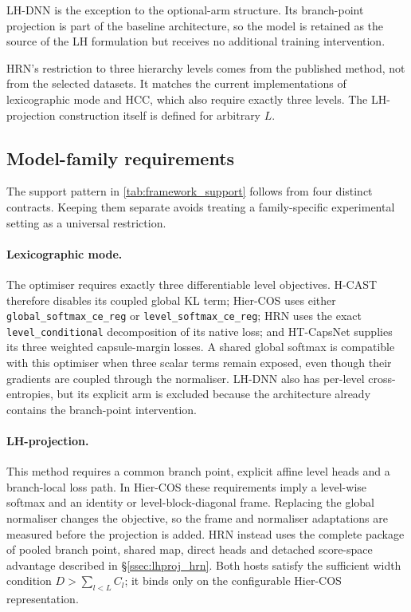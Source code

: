 LH-DNN is the exception to the optional-arm structure. Its branch-point
projection is part of the baseline architecture, so the model is retained as
the source of the LH formulation but receives no additional training
intervention.

HRN's restriction to three hierarchy levels comes from the published method,
not from the selected datasets. It matches the current implementations of
lexicographic mode and HCC, which also require exactly three levels. The
LH-projection construction itself is defined for arbitrary $L$.

\subsection{Model-family requirements}
\label{ssec:design_space}

The support pattern in \cref{tab:framework_support} follows from four distinct
contracts. Keeping them separate avoids treating a family-specific experimental
setting as a universal restriction.

\paragraph{Lexicographic mode.}
The optimiser requires exactly three differentiable level objectives. H-CAST
therefore disables its coupled global KL term; Hier-COS uses either
\texttt{global\_softmax\_ce\_reg} or \texttt{level\_softmax\_ce\_reg}; HRN uses
the exact \texttt{level\_conditional} decomposition of its native loss; and
HT-CapsNet supplies its three weighted capsule-margin losses. A shared global
softmax is compatible with this optimiser when three scalar terms remain
exposed, even though their gradients are coupled through the normaliser.
LH-DNN also has per-level cross-entropies, but its explicit arm is excluded
because the architecture already contains the branch-point intervention.

\paragraph{LH-projection.}
This method requires a common branch point, explicit affine level heads and a
branch-local loss path. In Hier-COS these requirements imply a level-wise
softmax and an identity or level-block-diagonal frame. Replacing the global
normaliser changes the objective, so the frame and normaliser adaptations are
measured before the projection is added. HRN instead uses the complete package
of pooled branch point, shared map, direct heads and detached score-space
advantage described in \S\ref{ssec:lhproj_hrn}. Both hosts satisfy the sufficient
width condition $D>\sum_{l<L}C_l$; it binds only on the configurable Hier-COS
representation.

